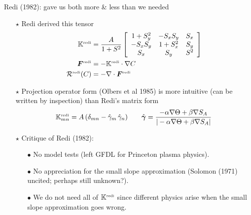 \documentclass{beamer}
\begin{document}
\begin{frame}{Redi (1982): gave us both more \& less than we needed}

\begin{itemize}
    \item[$\star$] Redi derived this tensor
\begin{align}
 \mathbb{K}^{\mbox{\tiny redi}} &= \frac{A }{1+S^{2}} 
 \left[ \begin{array}{ccc}
 1 + S_{y}^{2} 
 &
 -S_{x}S_{y}
 &
 S_{x}
 \\
 -S_{x}S_{y}
 &
 1 + S_{x}^{2} 
 &
 S_{y}
 \\
 S_{x}
 &
 S_{y}
 &
 S^{2}
\end{array} 
\right]
\\
{\bm F}^{\mbox{\tiny redi}}
&= -\mathbb{K}^{\mbox{\tiny redi}} \cdot \nabla C
\\
{\cal R}^{\mbox{\tiny redi}}(C) 
&= -\nabla \cdot {\bm F}^{\mbox{\tiny redi}}
\label{eq:redi-full-tensor}
\end{align}

\item[$\star$] Projection operator form (Olbers et al 1985) is more intuitive (can be written by inspection) than Redi's matrix form 
\begin{equation}
    \mathbb{K}^{\mbox{\tiny redi}}_{mn} 
    = A \, (\delta_{mn} - \hat{\gamma}_{m} \, \hat{\gamma}_{n})
    \qquad 
    \hat{\bm \gamma} = 
     \frac{-\alpha \nabla \Theta + \beta \nabla S_{A}}
          {|-\alpha \nabla \Theta + \beta \nabla S_{A}|}
\end{equation}

\item[$\star$] Critique of Redi (1982):
  \begin{itemize}
      \item[$\bullet$] No model tests (left GFDL for Princeton plasma physics). 
      \item[$\bullet$] No appreciation for the small slope approximation (Solomon (1971) uncited; perhaps still unknown?).  
      \item[$\bullet$] We do not need all of $\mathbb{K}^{\mbox{\tiny redi}}$ since different physics arise when the small slope approximation goes wrong.  
  \end{itemize}

\end{itemize}

\end{frame}
\end{document}
